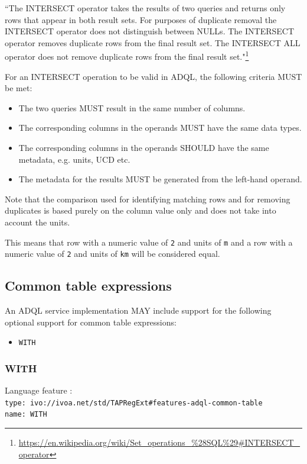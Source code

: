 \documentclass[11pt,a4paper]{ivoa}
\begin{document}
``The INTERSECT operator takes the results of two queries and returns only
rows that appear in both result sets. For purposes of duplicate removal
the INTERSECT operator does not distinguish between NULLs. The INTERSECT
operator removes duplicate rows from the final result set. The INTERSECT
ALL operator does not remove duplicate rows from the final result set."\footnote{\url{https://en.wikipedia.org/wiki/Set\_operations\_\%28SQL\%29\#INTERSECT\_operator}}

For an INTERSECT operation to be valid in ADQL, the following criteria MUST be met:

\begin{itemize}
    \item The two queries MUST result in the same number of columns.
    \item The corresponding columns in the operands MUST have the same data types.
    \item The corresponding columns in the operands SHOULD have the same metadata, e.g. units, UCD etc.
    \item The metadata for the results MUST be generated from the left-hand operand.
\end{itemize}

Note that the comparison used for identifying matching rows and for removing
duplicates is based purely on the column value only and does not take into
account the units.

This means that row with a numeric value of \verb:2: and units of \verb:m:
and a row with a numeric value of \verb:2: and units of \verb:km: will be
considered equal.

\subsection{Common table expressions}
\label{sec:common-table}

An ADQL service implementation MAY include support for the following optional
support for common table expressions:

\begin{itemize}
    \item \verb:WITH:
\end{itemize}

\subsubsection{WITH}
{\footnotesize Language feature :}\\
{\footnotesize \verb|type: ivo://ivoa.net/std/TAPRegExt#features-adql-common-table|}\\
{\footnotesize \verb|name: WITH|}\\
\end{document}
